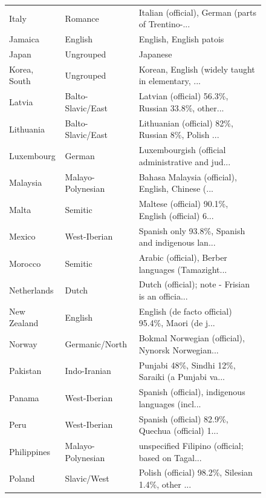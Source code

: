 \documentclass[a4paper,10pt]{article}
\begin{document}
\begin{figure}
\begin{center}
\begin{tabularx}{\textwidth}{llX}
Italy               &            Romance &  Italian (official), German (parts of Trentino-... \\
Jamaica             &            English &                            English, English patois \\
Japan               &          Ungrouped &                                           Japanese \\
Korea, South        &          Ungrouped &  Korean, English (widely taught in elementary, ... \\
Latvia              &  Balto-Slavic/East &  Latvian (official) 56.3\%, Russian 33.8\%, other... \\
Lithuania           &  Balto-Slavic/East &  Lithuanian (official) 82\%, Russian 8\%, Polish ... \\
Luxembourg          &             German &  Luxembourgish (official administrative and jud... \\
Malaysia            &  Malayo-Polynesian &  Bahasa Malaysia (official), English, Chinese (... \\
Malta               &            Semitic &  Maltese (official) 90.1\%, English (official) 6... \\
Mexico              &       West-Iberian &  Spanish only 93.8\%, Spanish and indigenous lan... \\
Morocco             &            Semitic &  Arabic (official), Berber languages (Tamazight... \\
Netherlands         &              Dutch &  Dutch (official); note - Frisian is an officia... \\
New Zealand         &            English &  English (de facto official) 95.4\%, Maori (de j... \\
Norway              &     Germanic/North &  Bokmal Norwegian (official), Nynorsk Norwegian... \\
Pakistan            &       Indo-Iranian &  Punjabi 48\%, Sindhi 12\%, Saraiki (a Punjabi va... \\
Panama              &       West-Iberian &  Spanish (official), indigenous languages (incl... \\
Peru                &       West-Iberian &  Spanish (official) 82.9\%, Quechua (official) 1... \\
Philippines         &  Malayo-Polynesian &  unspecified Filipino (official; based on Tagal... \\
Poland              &        Slavic/West &  Polish (official) 98.2\%, Silesian 1.4\%, other ... \\

\end{tabularx}
\end{center}
\end{figure}
\end{document}
